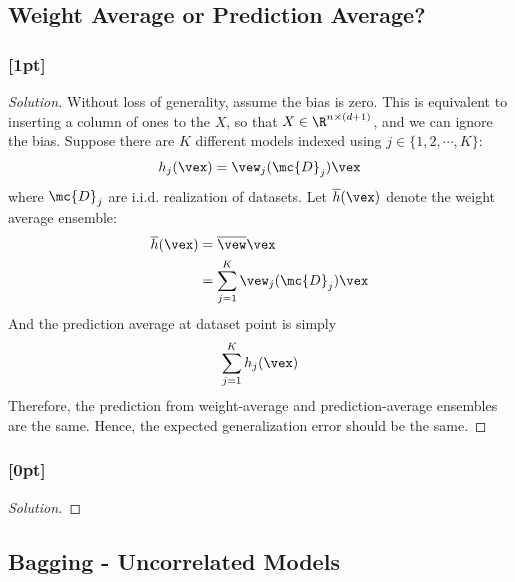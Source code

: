 \documentclass{article}
\begin{document}
	\subsection{Weight Average or Prediction Average?}
	\subsubsection{[1pt]}
	\begin{proof}[Solution]
		Without loss of generality, assume the bias is zero. This is equivalent to inserting a column of ones to the $X$, so that $X \in \R^{n \times (d+1)}$, and we can ignore the bias. Suppose there are $K$ different models indexed using $j \in \{1, 2, \cdots, K\}$:
		\begin{align}
			h_j(\vex) = \vew_j(\mc{D}_j)\vex
		\end{align}
		where $\mc{D}_j$ are i.i.d. realization of datasets. Let $\overline{h}(\vex)$ denote the weight average ensemble:
		\begin{align}
			\overline{h}(\vex) &= \overline{\vew} \vex\\
			&= \sum_{j=1}^K \vew_j(\mc{D}_j)\vex
		\end{align}
		And the prediction average at dataset point \vex is simply
		\begin{align}
			\sum_{j=1}^K h_j(\vex)
		\end{align}
		Therefore, the prediction from weight-average and prediction-average ensembles are the same. Hence, the expected generalization error should be the same.
	\end{proof}
	
	\subsubsection{[0pt]}
	\begin{proof}[Solution]
		
	\end{proof}
	
	\subsection{Bagging - Uncorrelated Models}
\end{document}
